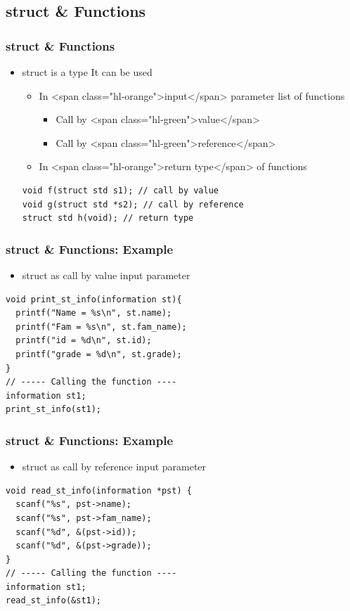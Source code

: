 \documentclass{../c-lecture}
\begin{document}
\subsection{struct \& Functions}

\begin{frame}[fragile]
  \frametitle{struct \& Functions}
  \begin{itemize}
    \item struct is a type \textrightarrow It can be used
    \begin{itemize}
      \item
        In <span class="hl-orange">input</span> parameter list of functions

      \begin{itemize}
        \item Call by <span class="hl-green">value</span>
        \item Call by <span class="hl-green">reference</span>
      \end{itemize}
      \item In <span class="hl-orange">return type</span> of functions
    \end{itemize}
    \begin{verbatim}
void f(struct std s1); // call by value
void g(struct std *s2); // call by reference
struct std h(void); // return type
    \end{verbatim}
  \end{itemize}
\end{frame}

\begin{frame}[fragile]
  \frametitle{struct \& Functions: Example}
  \begin{itemize}
    \item struct as call by value input parameter
  \end{itemize}
  \begin{verbatim}
void print_st_info(information st){
  printf("Name = %s\n", st.name);
  printf("Fam = %s\n", st.fam_name);
  printf("id = %d\n", st.id);
  printf("grade = %d\n", st.grade);
}
// ----- Calling the function ----
information st1;
print_st_info(st1);
  \end{verbatim}
\end{frame}

\begin{frame}[fragile]
  \frametitle{struct \& Functions: Example}
  \begin{itemize}
    \item struct as call by reference input parameter
  \end{itemize}
  \begin{verbatim}
void read_st_info(information *pst) {
  scanf("%s", pst->name);
  scanf("%s", pst->fam_name);
  scanf("%d", &(pst->id));
  scanf("%d", &(pst->grade));
}
// ----- Calling the function ----
information st1;
read_st_info(&st1);
  \end{verbatim}
\end{frame}
\end{document}
